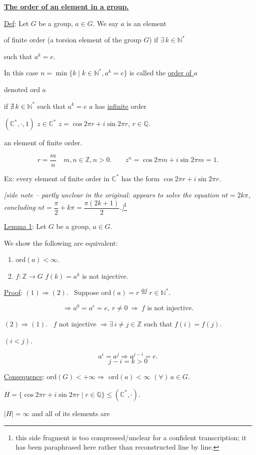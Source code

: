 \documentclass[12pt]{article}
\begin{document}
\noindent\underline{\textbf{The order of an element in a group.}}

\bigskip
\noindent\underline{Def}: Let $G$ be a group, $a\in G$. We say $a$ is an element

\noindent of finite order (a torsion element of the group $G$) if $\exists\, k\in\mathbb{N}^*$

\noindent such that $a^k=e$.

\bigskip
\noindent In this case $n=\min\{k \mid k\in\mathbb{N}^*, a^k=e\}$ is called the \underline{order of $a$}

\noindent denoted ord $a$

\bigskip
\noindent if $\nexists\, k\in\mathbb{N}^*$ such that $a^k=e$ \quad $a$ has \underline{infinite} order

\bigskip
\noindent $(\mathbb{C}^*,\cdot,1)$ \quad $z\in\mathbb{C}^*$ \quad $z=\cos 2\pi r + i\sin 2\pi r$, $r\in\mathbb{Q}$.

\noindent an element of finite order.

\[
r=\frac{m}{n} \quad m,n\in\mathbb{Z}, n>0. \qquad z^n = \cos 2\pi m + i\sin 2\pi m = 1.
\]

\noindent Ex: every element of finite order in $\mathbb{C}^*$ has the form $\cos 2\pi r+i\sin 2\pi r$.

\bigskip
\noindent \textit{[side note -- partly unclear in the original: appears to solve the equation $nt=2k\pi$, concluding $nt=\dfrac{\pi}{2}+k\pi=\dfrac{\pi(2k+1)}{2}$.]}\footnote{this side fragment is too compressed/unclear for a confident transcription; it has been paraphrased here rather than reconstructed line by line.}

\bigskip
\noindent\underline{Lemma 1}: Let $G$ be a group, $a\in G$.

\noindent We show the following are equivalent:

\begin{enumerate}
\item[(1)] ord$(a)<\infty$.
\item[(2)] $f:\mathbb{Z}\to G$ \quad $f(k)=a^k$ is not injective.
\end{enumerate}

\bigskip
\noindent\underline{Proof}: $(1)\Rightarrow(2)$. \ Suppose ord$(a)=r \overset{\text{def}}{=} r\in\mathbb{N}^*$.

\[
\Rightarrow a^0=a^r=e, \ r\neq 0 \ \Rightarrow \ f \text{ is not injective.}
\]

\bigskip
\noindent $(2)\Rightarrow(1)$. \ $f$ not injective $\Rightarrow \exists\, i\neq j\in\mathbb{Z}$ such that $f(i)=f(j)$.

\noindent $(i<j)$.

\[
a^i=a^j \Rightarrow a^{j-i}=e.
\]
\[
j-i=k>0
\]

\bigskip
\noindent\underline{Consequence}: ord$(G)<+\infty \Rightarrow$ ord$(a)<\infty$ $(\forall)\,a\in G$.

\bigskip
\noindent $H=\{\cos 2\pi r+i\sin 2\pi r \mid r\in\mathbb{Q}\} \leq (\mathbb{C}^*,\cdot)$.

\noindent $|H|=\infty$ and all of its elements are
\end{document}
